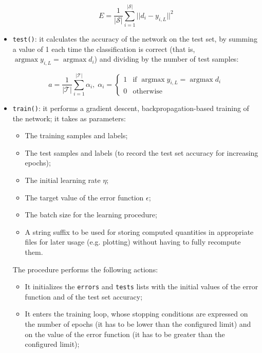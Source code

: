 \documentclass[letterpaper,headings=standardclasses]{scrartcl}
\DeclareMathOperator*{\argmax}{argmax}
\begin{document}
\begin{itemize}
    $$ E = \frac{1}{|\mathcal{S}|} \sum_{i = 1}^{|\mathcal{S}|} || d_i - y_{i,L} ||^2 $$
    
    \item \texttt{test()}: it calculates the accuracy of the network on the test set, by summing a value of 1 each time the classification is correct (that is, $ \argmax{y_{i,L}} = \argmax{d_i} $) and dividing by the number of test samples:
    
    $$ a = \frac{1}{|\mathcal{T}|} \sum_{i = 1}^{|\mathcal{T}|} \alpha_i, \; \alpha_i = \begin{cases} 1 & \text{if } \argmax{y_{i,L}} = \argmax{d_i} \\ 0 & \text{otherwise} \end{cases} $$
    
    \item \texttt{train()}: it performs a gradient descent, backpropagation-based training of the network; it takes as parameters:
    
    \begin{itemize}

        \item The training samples and labels;
        \item The test samples and labels (to record the test set accuracy for increasing epochs);
        \item The initial learning rate $\eta$;
        \item The target value of the error function $\epsilon$;
        \item The batch size for the learning procedure;
        \item A string suffix to be used for storing computed quantities in appropriate files for later usage (e.g. plotting) without having to fully recompute them.
    
    \end{itemize}

    The procedure performs the following actions:

    \begin{itemize}
        
        \item It initializes the \texttt{errors} and \texttt{tests} lists with the initial values of the error function and of the test set accuracy;
        
        \item It enters the training loop, whose stopping conditions are expressed on the number of epochs (it has to be lower than the configured limit) and on the value of the error function (it has to be greater than the configured limit);
        

\end{itemize}
\end{itemize}
\end{document}
